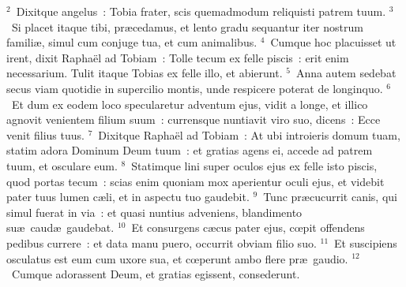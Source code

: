 ${}^{2}$~Dixitque angelus~: Tobia frater, scis quemadmodum reliquisti patrem tuum.
${}^{3}$~Si placet itaque tibi, pr\ae cedamus, et lento gradu sequantur iter nostrum famili\ae , simul cum conjuge tua, et cum animalibus.
${}^{4}$~Cumque hoc placuisset ut irent, dixit Rapha\"el ad Tobiam~: Tolle tecum ex felle piscis~: erit enim necessarium. Tulit itaque Tobias ex felle illo, et abierunt.
${}^{5}$~Anna autem sedebat secus viam quotidie in supercilio montis, unde respicere poterat de longinquo.
${}^{6}$~Et dum ex eodem loco specularetur adventum ejus, vidit a longe, et illico agnovit venientem filium suum~: currensque nuntiavit viro suo, dicens~: Ecce venit filius tuus.
${}^{7}$~Dixitque Rapha\"el ad Tobiam~: At ubi introieris domum tuam, statim adora Dominum Deum tuum~: et gratias agens ei, accede ad patrem tuum, et osculare eum.
${}^{8}$~Statimque lini super oculos ejus ex felle isto piscis, quod portas tecum~: scias enim quoniam mox aperientur oculi ejus, et videbit pater tuus lumen c\ae li, et in aspectu tuo gaudebit.
${}^{9}$~Tunc pr\ae cucurrit canis, qui simul fuerat in via~: et quasi nuntius adveniens, blandimento su\ae\ caud\ae\ gaudebat.
${}^{10}$~Et consurgens c\ae cus pater ejus, cœpit offendens pedibus currere~: et data manu puero, occurrit obviam filio suo.
${}^{11}$~Et suscipiens osculatus est eum cum uxore sua, et cœperunt ambo flere pr\ae\ gaudio.
${}^{12}$~Cumque adorassent Deum, et gratias egissent, consederunt.


